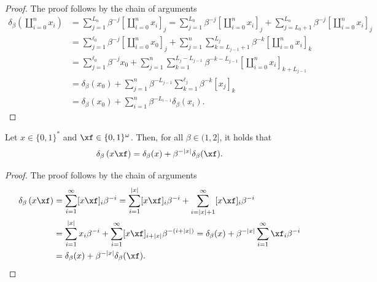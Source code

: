 \begin{proof} The proof follows by the chain of arguments
	\begin{align}
		\delta_\beta\left(\coprod_{i=0}^n x_i \right) &= \sum_{j=1}^{L_n} \beta^{-j}\left[\coprod_{i=0}^n x_i\right]_j = \sum_{j=1}^{L_0} \beta^{-j}\left[\coprod_{i=0}^n x_i\right]_j + \sum_{j=L_0+1}^{L_n} \beta^{-j}\left[\coprod_{i=0}^n x_i\right]_j\\
		& = \sum_{j=1}^{\ell_0} \beta^{-j}\left[\coprod_{i=0}^n x_0\right]_j + \sum_{j=1}^n \sum_{k=L_{j-1}+1}^{L_j} \beta^{-k}\left[\coprod_{i=0}^n x_i\right]_k\\
		&= \sum_{j=1}^{\ell_0} \beta^{-j}x_0 + \sum_{j=1}^n \sum_{k=1}^{L_j - L_{j-1}} \beta^{-k - L_{j-1}}\left[\coprod_{i=0}^n x_i\right]_{k + L_{j-1}}\\
		&= \delta_\beta(x_0) + \sum_{j=1}^n \beta^{-L_{j-1}}\sum_{k=1}^{\ell_j} \beta^{-k} \left[x_j\right]_k\\
		&= \delta_\beta(x_0) + \sum_{i=1}^n \beta^{-L_{i-1}} \delta_\beta(x_i).
	\end{align}
\end{proof}
\begin{lemma}\label{lem:factorisation of beta expansion through concatenation two}
	Let $x \in \{0,1\}^\ast$ and $\xf \in \{0,1\}^\omega$. Then, for all $\beta \in (1,2]$, it holds that
	\begin{equation}
		\delta_\beta\left( x  \xf \right) = \delta_\beta(x) + \beta^{-|x|} \delta_\beta(\xf).
	\end{equation}
\end{lemma}
\begin{proof}
	The proof follows by the chain of arguments
	\begin{align}
		\delta_\beta\left( x  \xf \right) &=  \sum_{i=1}^\infty [x  \xf]_i\beta^{-i} = \sum_{i=1}^{|x|} [x  \xf]_i\beta^{-i} + \sum_{i=|x| + 1}^{\infty} [x  \xf]_i\beta^{-i}\\
		&= \sum_{i=1}^{|x|} x_i\beta^{-i} + \sum_{i=1}^{\infty} [x  \xf]_{i+|x|}\beta^{-(i+|x|)} =\delta_\beta(x) + \beta^{-|x|} \sum_{i=1}^{\infty} \xf_{i}\beta^{-i}\\
		& =\delta_\beta(x) + \beta^{-|x|} \delta_\beta(\xf).
	\end{align}
\end{proof}



